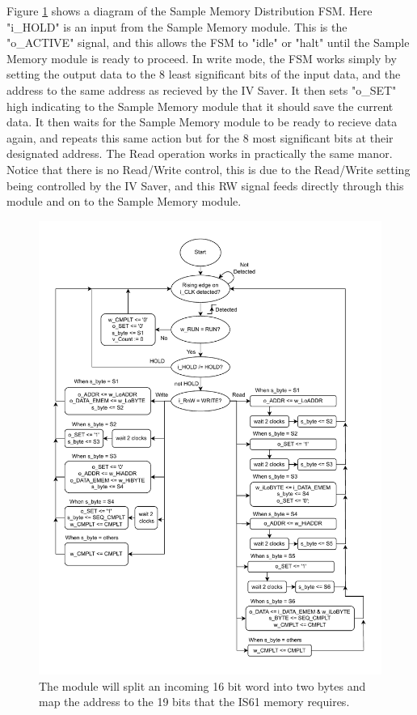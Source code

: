 Figure \ref{fig:7_2_6_MemDist} shows a diagram of the Sample Memory Distribution FSM. Here "i\_HOLD" is an input from the Sample Memory module. This is the "o\_ACTIVE" signal, and this allows the FSM to "idle" or "halt" until the Sample Memory module is ready to proceed. In write mode, the FSM works simply by setting the output data to the 8 least significant bits of the input data, and the address to the same address as recieved by the IV Saver. It then sets "o\_SET" high indicating to the Sample Memory module that it should save the current data. It then waits for the Sample Memory module to be ready to recieve data again, and repeats this same action but for the 8 most significant bits at their designated address. The Read operation works in practically the same manor. Notice that there is no Read/Write control, this is due to the Read/Write setting being controlled by the IV Saver, and this RW signal feeds directly through this module and on to the Sample Memory module.

\begin{figure}[H]
    \centering
    \includegraphics[clip, trim=0 0 0 0, width=1\textwidth]{Sections/7_SystemDesign/Figures/MDIST_FSM.pdf}
    \caption{The module will split an incoming 16 bit word into two bytes and map the address to the 19 bits that the IS61 memory requires.}
    \label{fig:7_2_6_MemDist}
\end{figure}

